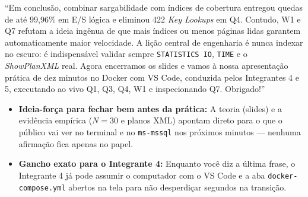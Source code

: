 \documentclass[10pt,a4paper]{article}
\begin{document}
\begin{falaBox}
``Em conclusão, combinar sargabilidade com índices de cobertura entregou quedas de até 99,96\% em E/S lógica e eliminou 422 \emph{Key Lookups} em Q4. Contudo, W1 e Q7 refutam a ideia ingênua de que mais índices ou menos páginas lidas garantem automaticamente maior velocidade. A lição central de engenharia é nunca indexar no escuro: é indispensável validar sempre \texttt{STATISTICS IO}, \texttt{TIME} e o \emph{ShowPlanXML} real. Agora encerramos os slides e vamos à nossa apresentação prática de dez minutos no Docker com VS Code, conduzida pelos Integrantes 4 e 5, executando ao vivo Q1, Q3, Q4, W1 e inspecionando Q7. Obrigado!''
\end{falaBox}

\begin{expBox}
  \begin{itemize}[leftmargin=14pt,itemsep=2pt,topsep=1pt]
    \item \textbf{Ideia-força para fechar bem antes da prática:} A teoria (slides) e a evidência empírica ($N=30$ e planos XML) apontam direto para o que o público vai ver no terminal e no \texttt{ms-mssql} nos próximos minutos — nenhuma afirmação fica apenas no papel.
    \item \textbf{Gancho exato para o Integrante 4:} Enquanto você diz a última frase, o Integrante 4 já pode assumir o computador com o VS Code e a aba \texttt{docker-compose.yml} abertos na tela para não desperdiçar segundos na transição.
  \end{itemize}
\end{expBox}
\end{document}
